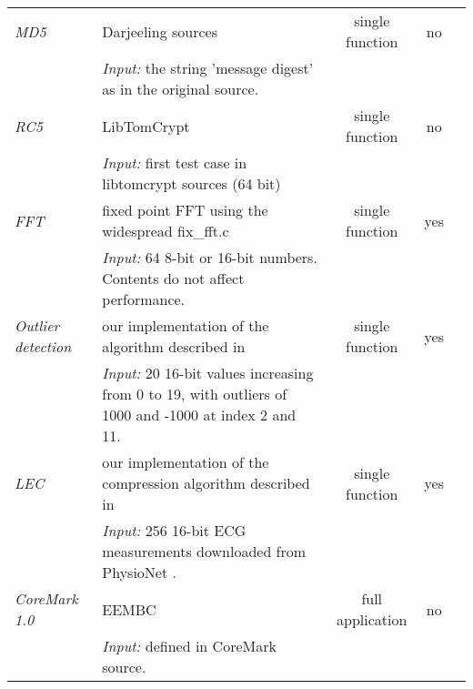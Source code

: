 \begin{table}
{\begin{tabular}{lp{}ccc}
    \emph{MD5}               & Darjeeling sources                                                                                         & single function  & no             & \cite{Brouwers:2009cj, Ellul:2012thesis} \\
                             & \emph{Input:} the string 'message digest' as in the original source.                                       &                  &                & \\
    \emph{RC5}               & LibTomCrypt \cite{libtomcrypt}                                                                             & single function  & no             & \\
                             & \emph{Input:} first test case in libtomcrypt sources (64 bit)                                              &                  &                & \\
    \emph{FFT}               & fixed point FFT using the widespread fix\_fft.c \cite{sos-operating-system}                                & single function  & yes            & \cite{Kumar:2007ge}                      \\
                             & \emph{Input:} 64 8-bit or 16-bit numbers. Contents do not affect performance.                              &                  &                & \\
    \emph{Outlier detection} & our implementation of the algorithm described in \cite{Kumar:2007ge}                                       & single function  & yes            & \cite{Kumar:2007ge}                      \\
                             & \emph{Input:} 20 16-bit values increasing from 0 to 19, with outliers of 1000 and -1000 at index 2 and 11. &                  &                & \\
    \emph{LEC}               & our implementation of the compression algorithm described in \cite{Marcelloni:2009ja}                      & single function  & yes            & \\
                             & \emph{Input:} 256 16-bit ECG measurements downloaded from PhysioNet \cite{physionet-ecg-data}.             &                  &                & \\
    \emph{CoreMark 1.0}      & EEMBC \cite{coremark}                                                                                      & full application & no             & \\
                             & \emph{Input:} defined in CoreMark source.                                                                  &                  &                & \\

\end{tabular}}
\end{table}
